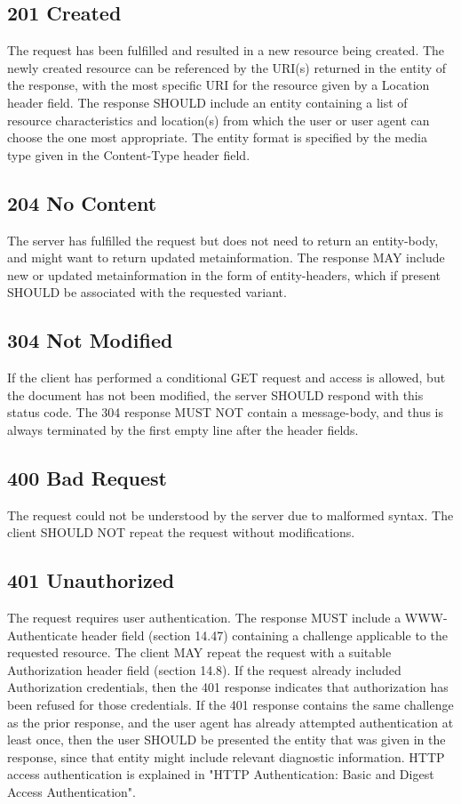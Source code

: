 \documentclass{report}
\begin{document}
	\subsection{201 Created}
	The request has been fulfilled and resulted in a new resource being created. The newly created resource can be referenced by the URI(s) returned in the entity of the response, with the most specific URI for the resource given by a Location header field. The response SHOULD include an entity containing a list of resource characteristics and location(s) from which the user or user agent can choose the one most appropriate. The entity format is specified by the media type given in the Content-Type header field.
	\subsection{204 No Content}
	The server has fulfilled the request but does not need to return an entity-body, and might want to return updated metainformation. The response MAY include new or updated metainformation in the form of entity-headers, which if present SHOULD be associated with the requested variant.
	\subsection{304 Not Modified}	
	If the client has performed a conditional GET request and access is allowed, but the document has not been modified, the server SHOULD respond with this status code. The 304 response MUST NOT contain a message-body, and thus is always terminated by the first empty line after the header fields.
	\subsection{400 Bad Request}
	The request could not be understood by the server due to malformed syntax. The client SHOULD NOT repeat the request without modifications.
	\subsection{401 Unauthorized}
	The request requires user authentication. The response MUST include a WWW-Authenticate header field (section 14.47) containing a challenge applicable to the requested resource. The client MAY repeat the request with a suitable Authorization header field (section 14.8). If the request already included Authorization credentials, then the 401 response indicates that authorization has been refused for those credentials. If the 401 response contains the same challenge as the prior response, and the user agent has already attempted authentication at least once, then the user SHOULD be presented the entity that was given in the response, since that entity might include relevant diagnostic information. HTTP access authentication is explained in "HTTP Authentication: Basic and Digest Access Authentication".
\end{document}
